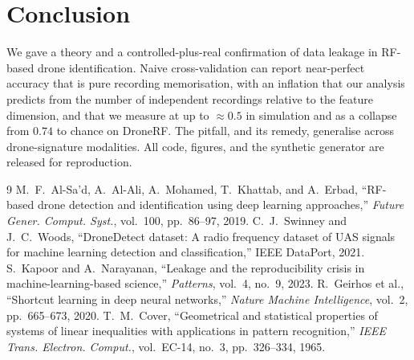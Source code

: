 \documentclass[11pt]{article}
\begin{document}
\section{Conclusion}
We gave a theory and a controlled-plus-real confirmation of data leakage in RF-based drone identification. Naive cross-validation can report near-perfect accuracy that is pure recording memorisation, with an inflation that our analysis predicts from the number of independent recordings relative to the feature dimension, and that we measure at up to $\approx0.5$ in simulation and as a collapse from $0.74$ to chance on DroneRF. The pitfall, and its remedy, generalise across drone-signature modalities. All code, figures, and the synthetic generator are released for reproduction.

\begin{thebibliography}{9}
 M.~F.~Al-Sa'd, A.~Al-Ali, A.~Mohamed, T.~Khattab, and A.~Erbad, ``RF-based drone detection and identification using deep learning approaches,'' \emph{Future Gener. Comput. Syst.}, vol.~100, pp.~86--97, 2019.
 C.~J.~Swinney and J.~C.~Woods, ``DroneDetect dataset: A radio frequency dataset of UAS signals for machine learning detection and classification,'' IEEE DataPort, 2021.
 S.~Kapoor and A.~Narayanan, ``Leakage and the reproducibility crisis in machine-learning-based science,'' \emph{Patterns}, vol.~4, no.~9, 2023.
 R.~Geirhos et al., ``Shortcut learning in deep neural networks,'' \emph{Nature Machine Intelligence}, vol.~2, pp.~665--673, 2020.
 T.~M.~Cover, ``Geometrical and statistical properties of systems of linear inequalities with applications in pattern recognition,'' \emph{IEEE Trans. Electron. Comput.}, vol.~EC-14, no.~3, pp.~326--334, 1965.
\end{thebibliography}
\end{document}
